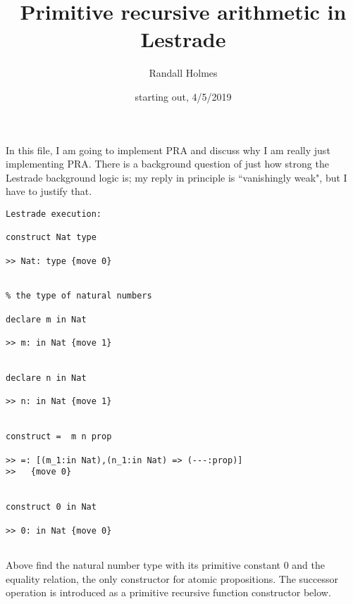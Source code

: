\documentclass[12pt]{article}
\title{Primitive recursive arithmetic in Lestrade}
\author{Randall Holmes}
\date{starting out, 4/5/2019}
\begin{document}
\maketitle

In this file, I am going to implement PRA and discuss why I am really just implementing PRA.  There is a background question of just how strong the Lestrade background logic is;
my reply in principle is ``vanishingly weak", but I have to justify that.

\begin{verbatim}Lestrade execution:

construct Nat type

>> Nat: type {move 0}


% the type of natural numbers

declare m in Nat

>> m: in Nat {move 1}


declare n in Nat

>> n: in Nat {move 1}


construct =  m n prop

>> =: [(m_1:in Nat),(n_1:in Nat) => (---:prop)]
>>   {move 0}


construct 0 in Nat

>> 0: in Nat {move 0}


\end{verbatim}

Above find the natural number type with its primitive constant 0 and the equality relation, the only constructor for atomic propositions.  The successor operation is introduced
as a primitive recursive function constructor below.
\end{document}
